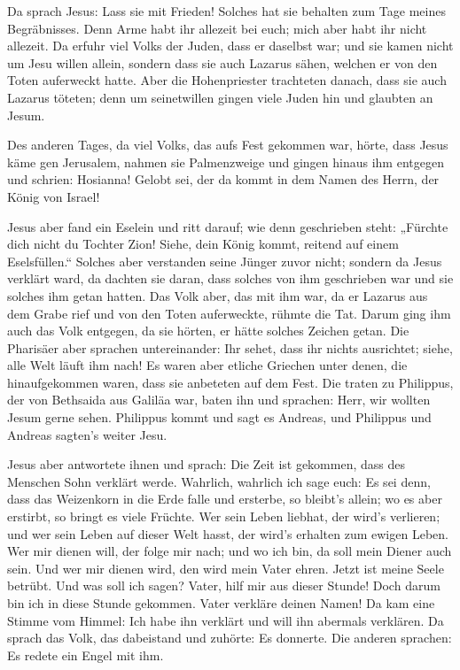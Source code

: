  Da sprach Jesus: Lass sie mit Frieden! Solches hat sie
behalten zum Tage meines Begräbnisses.  Denn Arme habt ihr
allezeit bei euch; mich aber habt ihr nicht allezeit.  Da
erfuhr viel Volks der Juden, dass er daselbst war; und sie kamen nicht
um Jesu willen allein, sondern dass sie auch Lazarus sähen, welchen er
von den Toten auferweckt hatte.  Aber die Hohenpriester
trachteten danach, dass sie auch Lazarus töteten;  denn
um seinetwillen gingen viele Juden hin und glaubten an Jesum.

 Des anderen Tages, da viel Volks, das aufs Fest gekommen
war, hörte, dass Jesus käme gen Jerusalem,  nahmen sie
Palmenzweige und gingen hinaus ihm entgegen und schrien: Hosianna!
Gelobt sei, der da kommt in dem Namen des Herrn, der König von Israel!

 Jesus aber fand ein Eselein und ritt darauf; wie denn
geschrieben steht:  „Fürchte dich nicht du Tochter Zion!
Siehe, dein König kommt, reitend auf einem Eselsfüllen.``
 Solches aber verstanden seine Jünger zuvor nicht;
sondern da Jesus verklärt ward, da dachten sie daran, dass solches von
ihm geschrieben war und sie solches ihm getan hatten. 
Das Volk aber, das mit ihm war, da er Lazarus aus dem Grabe rief und von
den Toten auferweckte, rühmte die Tat.  Darum ging ihm
auch das Volk entgegen, da sie hörten, er hätte solches Zeichen getan.
 Die Pharisäer aber sprachen untereinander: Ihr sehet,
dass ihr nichts ausrichtet; siehe, alle Welt läuft ihm nach!
 Es waren aber etliche Griechen unter denen, die
hinaufgekommen waren, dass sie anbeteten auf dem Fest. 
Die traten zu Philippus, der von Bethsaida aus Galiläa war, baten ihn
und sprachen: Herr, wir wollten Jesum gerne sehen. 
Philippus kommt und sagt es Andreas, und Philippus und Andreas sagten's
weiter Jesu.

 Jesus aber antwortete ihnen und sprach: Die Zeit ist
gekommen, dass des Menschen Sohn verklärt werde. 
Wahrlich, wahrlich ich sage euch: Es sei denn, dass das Weizenkorn in
die Erde falle und ersterbe, so bleibt's allein; wo es aber erstirbt, so
bringt es viele Früchte.  Wer sein Leben liebhat, der
wird's verlieren; und wer sein Leben auf dieser Welt hasst, der wird's
erhalten zum ewigen Leben.  Wer mir dienen will, der
folge mir nach; und wo ich bin, da soll mein Diener auch sein. Und wer
mir dienen wird, den wird mein Vater ehren.  Jetzt ist
meine Seele betrübt. Und was soll ich sagen? Vater, hilf mir aus dieser
Stunde! Doch darum bin ich in diese Stunde gekommen. 
Vater verkläre deinen Namen! Da kam eine Stimme vom Himmel: Ich habe ihn
verklärt und will ihn abermals verklären.  Da sprach das
Volk, das dabeistand und zuhörte: Es donnerte. Die anderen sprachen: Es
redete ein Engel mit ihm.

